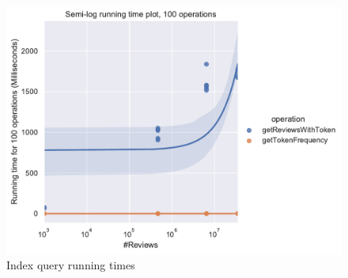 \documentclass[11pt]{article}
\begin{document}
\begin{figure}[!htb]
	\caption{Index query running times}
	\label{fig:ops}
	\centering
	\includegraphics[width=\textwidth,height=\textheight,keepaspectratio]{ops.pdf}
\end{figure}
\end{document}

